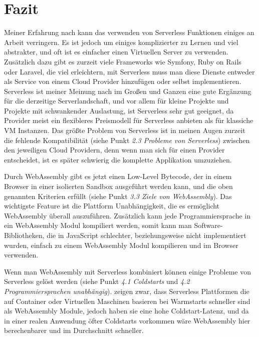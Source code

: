 \section{Fazit}

Meiner Erfahrung nach kann das verwenden von Serverless Funktionen einiges an Arbeit verringern. Es ist jedoch um einiges komplizierter zu Lernen und viel abstrakter, und oft ist es einfacher einen Virtuellen Server zu verwenden. Zusätzlich dazu gibt es zurzeit viele Frameworks wie Symfony, Ruby on Rails oder Laravel, die viel erleichtern, mit Serverless muss man diese Dienste entweder als Service von einem Cloud Provider hinzufügen oder selbst implementieren. Serverless ist meiner Meinung nach im Großen und Ganzen eine gute Ergänzung für die derzeitige Serverlandschaft, und vor allem für kleine Projekte und Projekte mit schwankender Auslastung, ist Serverless sehr gut geeignet, da Provider meist ein flexibleres Preismodell für Serverless anbieten als für klassiche VM Instanzen. Das größte Problem von Serverless ist in meinen Augen zurzeit die fehlende Kompatibilität (siehe Punkt \textit{2.3 Probleme von Serverless}) zwischen den jeweiligen Cloud Providern, denn wenn man sich für einen Provider entscheidet, ist es später schwierig die komplette Applikation umzuziehen.

Durch WebAssembly gibt es jetzt einen Low-Level Bytecode, der in einem Browser in einer isolierten Sandbox ausgeführt werden kann, und die oben genannten Kriterien erfüllt (siehe Punkt \textit{3.3 Ziele von WebAssembly}). Das wichtigste Feature ist die Plattform Unabhängigkeit, die es ermöglicht WebAssembly überall auszuführen. Zusätzlich kann jede Programmiersprache in ein WebAssembly Modul kompiliert werden, somit kann man Software-Bibliotheken, die in JavaScript schlechter, beziehungsweise nicht implementiert wurden, einfach zu einem WebAssembly Modul kompilieren und im Browser verwenden.

Wenn man WebAssembly mit Serverless kombiniert können einige Probleme von Serverless gelöst werden (siehe Punkt \textit{4.1 Coldstarts} und \textit{4.2 Programmiersprachen unabhängig}). \cite{Hall2019} zeigen zwar, dass Serverless Plattformen die auf Container oder Virtuellen Maschinen basieren bei Warmstarts schneller sind als WebAssembly Module, jedoch haben sie eine hohe Coldstart-Latenz, und da in einer realen Anwendung öfter Coldstarts vorkommen wäre WebAssembly hier berechenbarer und im Durchschnitt schneller.